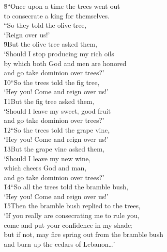 \begin{poetry}
\poeml \v{8}``Once upon a time the trees went out \\
\poemll    to consecrate a king for themselves. \\
\poeml ``So they told the olive tree, \\
\poemll    `Reign over us!' \\
\poeml \v{9}But the olive tree asked them, \\
\poemll    `Should I stop producing my rich oils \\
\poemlll       by which both God and men are honored \\
\poemll    and go take dominion over trees?' \\
\poeml \v{10}``So the trees told the fig tree, \\
\poemll    `Hey you! Come and reign over us!' \\
\poeml \v{11}But the fig tree asked them, \\
\poemll    `Should I leave my sweet, good fruit \\
\poemlll       and go take dominion over trees?' \\
\poeml \v{12}``So the trees told the grape vine, \\
\poemll    `Hey you! Come and reign over us!' \\
\poeml \v{13}But the grape vine asked them, \\
\poemll    `Should I leave my new wine, \\
\poemlll       which cheers God and man, \\
\poemll    and go take dominion over trees?' \\
\poeml \v{14}``So all the trees told the bramble bush, \\
\poemll    `Hey you! Come and reign over us!' \\
\poeml \v{15}Then the bramble bush replied to the trees, \\
\poemll    `If you really are consecrating me to rule you, \\
\poemlll       come and put your confidence in my shade; \\
\poemll    but if not, may fire spring out from the bramble bush \\
\poemlll       and burn up the cedars of Lebanon{\ldots}'
\end{poetry}

